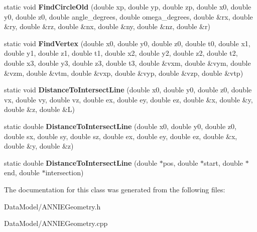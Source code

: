 \begin{DoxyCompactItemize}
\item 
\hypertarget{classANNIEGeometry_a9b64b97c795a3ff52ff8473b844949ab}{static void {\bfseries Find\-Circle\-Old} (double xp, double yp, double zp, double x0, double y0, double z0, double angle\-\_\-degrees, double omega\-\_\-degrees, double \&rx, double \&ry, double \&rz, double \&nx, double \&ny, double \&nz, double \&r)}\label{classANNIEGeometry_a9b64b97c795a3ff52ff8473b844949ab}

\item 
\hypertarget{classANNIEGeometry_a84d4314f64f749a0a7c9a771805226dc}{static void {\bfseries Find\-Vertex} (double x0, double y0, double z0, double t0, double x1, double y1, double z1, double t1, double x2, double y2, double z2, double t2, double x3, double y3, double z3, double t3, double \&vxm, double \&vym, double \&vzm, double \&vtm, double \&vxp, double \&vyp, double \&vzp, double \&vtp)}\label{classANNIEGeometry_a84d4314f64f749a0a7c9a771805226dc}

\item 
\hypertarget{classANNIEGeometry_a3ad5ab10afc05105f6be10e87fb69227}{static void {\bfseries Distance\-To\-Intersect\-Line} (double x0, double y0, double z0, double vx, double vy, double vz, double ex, double ey, double ez, double \&x, double \&y, double \&z, double \&L)}\label{classANNIEGeometry_a3ad5ab10afc05105f6be10e87fb69227}

\item 
\hypertarget{classANNIEGeometry_a7564706390f93705700a15d4cf4f43a6}{static double {\bfseries Distance\-To\-Intersect\-Line} (double x0, double y0, double z0, double sx, double sy, double sz, double ex, double ey, double ez, double \&x, double \&y, double \&z)}\label{classANNIEGeometry_a7564706390f93705700a15d4cf4f43a6}

\item 
\hypertarget{classANNIEGeometry_ac39690635de68c00b8c806fcca9ff597}{static double {\bfseries Distance\-To\-Intersect\-Line} (double $\ast$pos, double $\ast$start, double $\ast$end, double $\ast$intersection)}\label{classANNIEGeometry_ac39690635de68c00b8c806fcca9ff597}

\end{DoxyCompactItemize}


The documentation for this class was generated from the following files\-:\begin{DoxyCompactItemize}
\item 
Data\-Model/A\-N\-N\-I\-E\-Geometry.\-h\item 
Data\-Model/A\-N\-N\-I\-E\-Geometry.\-cpp\end{DoxyCompactItemize}
